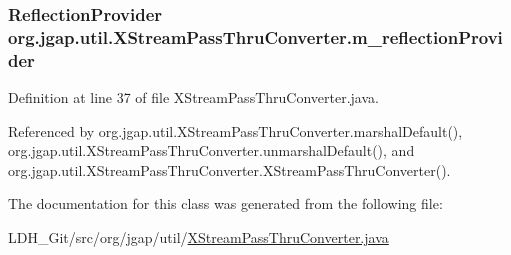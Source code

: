 \hypertarget{classorg_1_1jgap_1_1util_1_1_x_stream_pass_thru_converter_abbdb06abd810f8dfca417bb04b2bd217}{
\subsubsection[{m\-\_\-reflection\-Provider}]{\setlength{\rightskip}{0pt plus 5cm}Reflection\-Provider org.\-jgap.\-util.\-X\-Stream\-Pass\-Thru\-Converter.\-m\-\_\-reflection\-Provider\hspace{0.3cm}{\ttfamily [private]}}}\label{classorg_1_1jgap_1_1util_1_1_x_stream_pass_thru_converter_abbdb06abd810f8dfca417bb04b2bd217}


Definition at line 37 of file X\-Stream\-Pass\-Thru\-Converter.\-java.



Referenced by org.\-jgap.\-util.\-X\-Stream\-Pass\-Thru\-Converter.\-marshal\-Default(), org.\-jgap.\-util.\-X\-Stream\-Pass\-Thru\-Converter.\-unmarshal\-Default(), and org.\-jgap.\-util.\-X\-Stream\-Pass\-Thru\-Converter.\-X\-Stream\-Pass\-Thru\-Converter().



The documentation for this class was generated from the following file\-:\begin{DoxyCompactItemize}
\item 
L\-D\-H\-\_\-\-Git/src/org/jgap/util/\hyperlink{_x_stream_pass_thru_converter_8java}{X\-Stream\-Pass\-Thru\-Converter.\-java}\end{DoxyCompactItemize}
